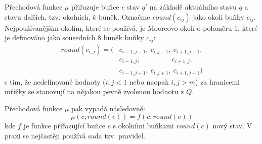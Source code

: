 \documentclass[a4paper,10pt]{article}
\begin{document}
Přechodová funkce $\mu$ přiřazuje buňce $c$ stav $q'$ na základě aktuálního stavu $q$ a stavu dalších, tzv. okolních, $k$ buněk. Označme $round(c_{ij})$ jako okolí buňky $c_{ij}$. Nejpoužívanějším okolím, které se používá, je Mooreovo okolí o poloměru $1$, které je definováno jako sousedních $8$ buněk buňky $c_{ij}$:
\begin{align*}
 round(c_{i,j}) = (
  & c_{i-1, j-1},\ 	c_{i, j-1},\ 	c_{i+1, j-1},	\\
  & c_{i-1, j  },\ 	\qquad \qquad\ 	c_{i+1, j  },	\\
  & c_{i-1, j+1},\ 	c_{i, j+1},\ 	c_{i+1, j+1}	
 )
\end{align*}
s tím, že nedefinované hodnoty ($i,j < 1$ nebo naopak $i,j > m$) za hranicemi mřížky se stanovují na nějakou pevně zvolenou hodnotu z $Q$.

Přechodová funkce $\mu$ pak vypadá následovně:
$$
\mu(c, round(c)) = f(c, round(c))
$$
kde $f$ je funkce přiřazující buňce $c$ s okolními buňkami $round(c)$ nový stav. V praxi se nejčastěji používá sada tzv. \ifthen pravidel.
\end{document}
